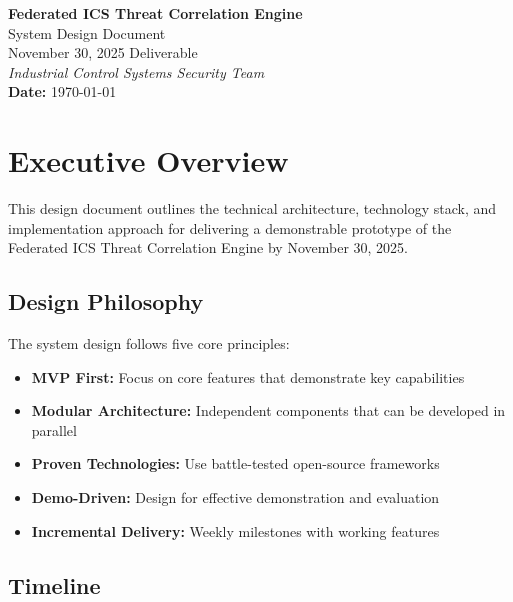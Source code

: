 \documentclass[12pt,a4paper]{article}
\begin{document}
\begin{center}
    \vspace*{0.5cm}
    {\Huge \textbf{Federated ICS Threat Correlation Engine}}\\[0.4cm]
    {\LARGE System Design Document}\\[0.3cm]
    {\large November 30, 2025 Deliverable}\\[0.2cm]
    \textit{Industrial Control Systems Security Team}\\[0.1cm]
    \textbf{Date:} \today\\
    \vspace{0.5cm}
\end{center}

\tableofcontents
\newpage

\section{Executive Overview}

This design document outlines the technical architecture, technology stack, and implementation approach for delivering a demonstrable prototype of the Federated ICS Threat Correlation Engine by November 30, 2025.

\subsection{Design Philosophy}

The system design follows five core principles:

\begin{itemize}[leftmargin=1cm,itemsep=0pt]
    \item \textbf{MVP First:} Focus on core features that demonstrate key capabilities
    \item \textbf{Modular Architecture:} Independent components that can be developed in parallel
    \item \textbf{Proven Technologies:} Use battle-tested open-source frameworks
    \item \textbf{Demo-Driven:} Design for effective demonstration and evaluation
    \item \textbf{Incremental Delivery:} Weekly milestones with working features
\end{itemize}

\subsection{Timeline}
\end{document}
